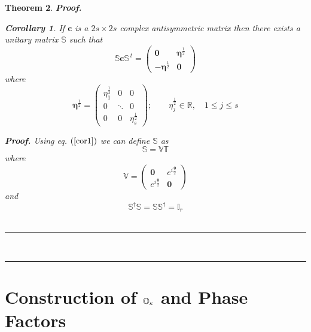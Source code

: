 \documentclass[aps,preprint]{revtex4}
\newtheorem{theorem}{Theorem}
\newtheorem{corollary}[theorem]{Corollary}
\newenvironment{proof}[1][Proof]{\noindent\textbf{#1.} }{\ \rule{0.5em}{0.5em}}
\begin{document}
\begin{theorem}
\begin{proof}
\begin{corollary}
If $\mathbf{c}$ is a $2s\times 2s$ complex antisymmetric matrix then there
exists a unitary matrix $\mathbb{S}$ such that 
\begin{equation}
\mathbb{S}\mathbf{c}\mathbb{S}^{\,t}=\left( 
\begin{array}{cc}
\mathbf{0} & \mathbf{\eta }^{\frac{1}{2}} \\ 
-\mathbf{\eta }^{\frac{1}{2}} & \mathbf{0}%
\end{array}%
\right)
\end{equation}%
where 
\begin{equation}
\mathbf{\eta }^{\frac{1}{2}}=\left( 
\begin{array}{ccc}
\eta _{1}^{\frac{1}{2}} & 0 & 0 \\ 
0 & \ddots & 0 \\ 
0 & 0 & \eta _{s}^{\frac{1}{2}}%
\end{array}%
\right) ;\qquad \eta _{j}^{\frac{1}{2}}\in \mathbb{R},\quad 1\leq j\leq s
\end{equation}

\begin{proof}
Using eq. $\left( \ref{cor1}\right) $ we can define $\mathbb{S}$ as 
\begin{equation}
\mathbb{S=VT}
\end{equation}%
where 
\begin{equation}
\mathbb{V}=\left( 
\begin{array}{cc}
\mathbf{0} & e^{i\frac{\mathbf{\theta }}{2}} \\ 
e^{i\frac{\mathbf{\theta }}{2}} & \mathbf{0}%
\end{array}%
\right)
\end{equation}%
and 
\begin{equation}
\mathbb{S}^{\dagger }\mathbb{S=SS}^{\dagger }\mathbb{=I}_{r}
\end{equation}
\end{proof}
\end{corollary}
\end{proof}
\end{theorem}

\section{Construction of $\mathbb{O}_{\protect\kappa }$ and Phase Factors}
\end{document}
